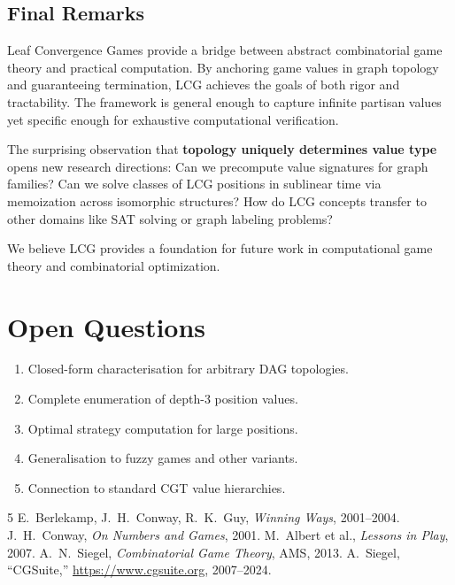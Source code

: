 \documentclass[10pt,a4paper,twocolumn]{article}
\theoremstyle{plain}
\theoremstyle{definition}
\theoremstyle{remark}
\begin{document}
\subsection{Final Remarks}

Leaf Convergence Games provide a bridge between abstract combinatorial game theory and practical computation. By anchoring game values in graph topology and guaranteeing termination, LCG achieves the goals of both rigor and tractability. The framework is general enough to capture infinite partisan values yet specific enough for exhaustive computational verification.

The surprising observation that \textbf{topology uniquely determines value type} opens new research directions: Can we precompute value signatures for graph families? Can we solve classes of LCG positions in sublinear time via memoization across isomorphic structures? How do LCG concepts transfer to other domains like SAT solving or graph labeling problems?

We believe LCG provides a foundation for future work in computational game theory and combinatorial optimization.

\section{Open Questions}

\begin{enumerate}[label=(\roman*)]
\item Closed-form characterisation for arbitrary DAG topologies.
\item Complete enumeration of depth-3 position values.
\item Optimal strategy computation for large positions.
\item Generalisation to fuzzy games and other variants.
\item Connection to standard CGT value hierarchies.
\end{enumerate}

\begin{thebibliography}{5}
 E.~Berlekamp, J.~H.~Conway, R.~K.~Guy, \textit{Winning Ways}, 2001--2004.
 J.~H.~Conway, \textit{On Numbers and Games}, 2001.
 M.~Albert et al., \textit{Lessons in Play}, 2007.
 A.~N.~Siegel, \textit{Combinatorial Game Theory}, AMS, 2013.
 A.~Siegel, ``CGSuite,'' \url{https://www.cgsuite.org}, 2007--2024.
\end{thebibliography}
\end{document}
